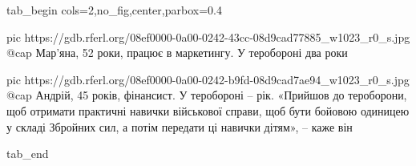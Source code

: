  
 
 
 
 


\ifcmt
  tab_begin cols=2,no_fig,center,parbox=0.4

     pic https://gdb.rferl.org/08ef0000-0a00-0242-43cc-08d9cad77885_w1023_r0_s.jpg
		 @cap Мар’яна, 52 роки, працює в маркетингу. У теробороні два роки

		 pic https://gdb.rferl.org/08ef0000-0a00-0242-b9fd-08d9cad7ae94_w1023_r0_s.jpg
		 @cap Андрій, 45 років, фінансист. У теробороні – рік. «Прийшов до тероборони, щоб отримати практичні навички військової справи, щоб бути бойовою одиницею у складі Збройних сил, а потім передати ці навички дітям», – каже він

  tab_end
\fi

